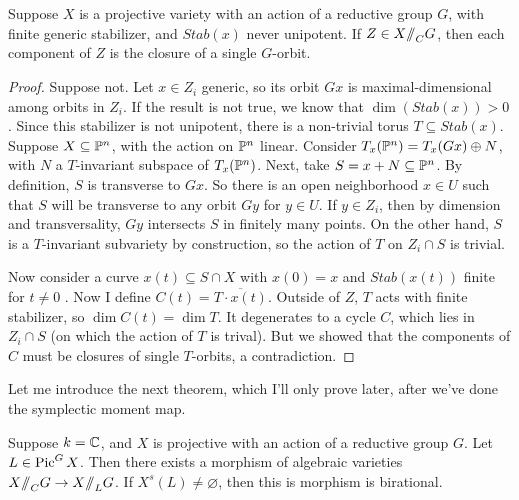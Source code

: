
Suppose $X$ is a projective variety with an action of a reductive group $G$, with finite generic stabilizer, and $Stab(x)$ never unipotent. If $Z\in X\mbox{\rm /\!\!/}_C G$, then each component of $Z$ is the closure of a single $G$-orbit.
\begin{proof}
 Suppose not. Let $x\in Z_i$ generic, so its orbit $Gx$ is maximal-dimensional among orbits in $Z_i$. If the result is not true, we know that $\dim(Stab(x))>0$. Since this stabilizer is not unipotent, there is a non-trivial torus $T\subseteq Stab(x)$. Suppose $X\subseteq \mathbb{P}^n$, with the action on $\mathbb{P}^n$ linear. Consider $T_x(\mathbb{P}^n)=T_x(Gx)\oplus N$, with $N$ a $T$-invariant subspace of $T_x(\mathbb{P}^n)$. Next, take $S=x+N\subseteq \mathbb{P}^n$. By definition, $S$ is transverse to $Gx$. So there is an open neighborhood $x\in U$ such that $S$ will be transverse to any orbit $Gy$ for $y\in U$. If $y\in Z_i$, then by dimension and transversality, $Gy$ intersects $S$ in finitely many points. On the other hand, $S$ is a $T$-invariant subvariety by construction, so the action of $T$ on $Z_i\cap S$ is trivial.
 
 Now consider a curve $x(t)\subseteq S\cap X$ with $x(0)=x$ and $Stab(x(t))$ finite for $t\neq 0$ . Now I define $C(t)=\overline{T\cdot x(t)}$. Outside of $Z$, $T$ acts with finite stabilizer, so $\dim C(t)=\dim T$. It degenerates to a cycle $C$, which lies in $Z_i\cap S$ (on which the action of $T$ is trival). But we showed that the components of $C$ must be closures of single $T$-orbits, a contradiction.
\end{proof}

Let me introduce the next theorem, which I'll only prove later, after we've done the symplectic moment map.
\begin{theorem}
 Suppose $k=\mathbb{C}$, and $X$ is projective with an action of a reductive group $G$. Let $L\in \operatorname{Pic}^GX$. Then there exists a morphism of algebraic varieties $X\mbox{\rm /\!\!/}_C G\to X\mbox{\rm /\!\!/}_L G$. If $X^s(L)\neq\varnothing$, then this is morphism is birational.
\end{theorem}

